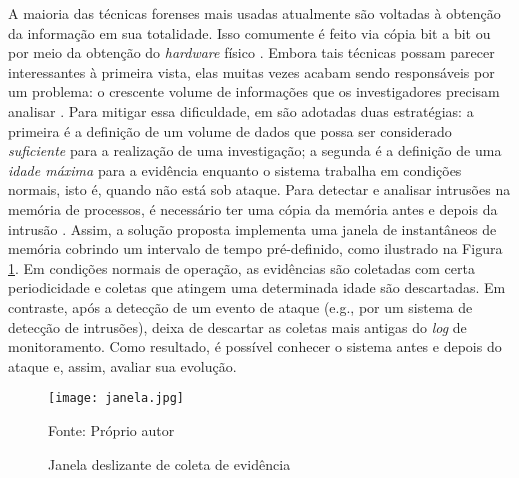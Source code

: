 A maioria das técnicas forenses mais usadas atualmente são voltadas à obtenção da informação em sua totalidade.
%
Isso comumente é feito via cópia bit a bit ou por meio da obtenção do \textit{hardware} físico \cite{SimouCloudChlng:2014} \cite{BemPastPresentFuture:2008}. 
%
Embora tais técnicas possam parecer interessantes à primeira vista, elas muitas vezes acabam sendo responsáveis por um problema: o crescente volume de informações que os investigadores precisam analisar \cite{QuickIncreaseVolumeImpact:2014}.
%
Para mitigar essa dificuldade, em \fancyname são adotadas duas estratégias: a primeira é a definição de um volume de dados que possa ser considerado \textit{suficiente} para a realização de uma investigação; a segunda é a definição de uma \textit{idade máxima} para a evidência enquanto o sistema trabalha em condições normais, isto é, quando não está sob ataque.
%
Para detectar e analisar intrusões na memória de processos, é necessário ter uma cópia da memória antes e depois da intrusão \cite{CaseMemoryForensics:2014}. 
%
Assim, a solução proposta implementa uma janela de instantâneos de memória cobrindo um intervalo de tempo pré-definido, como ilustrado na Figura \ref{fig:janela}. 
%
Em condições normais de operação, as evidências são coletadas com certa periodicidade e coletas que atingem uma determinada idade são descartadas.
%
Em contraste, após a detecção de um evento de ataque (e.g., por um sistema de detecção de intrusões), \fancyname deixa de descartar as coletas mais antigas do \textit{log} de monitoramento.
%
Como resultado, é possível conhecer o sistema antes e depois do ataque e, assim, avaliar sua evolução.
%
%

\begin{figure}[htb!]
\footnotesize
\caption{Janela deslizante de coleta de evidência}
\texttt{[image: janela.jpg]}
\centering
\label{fig:janela}
\begin{center}
Fonte: Próprio autor 
\end{center}
\end{figure}

